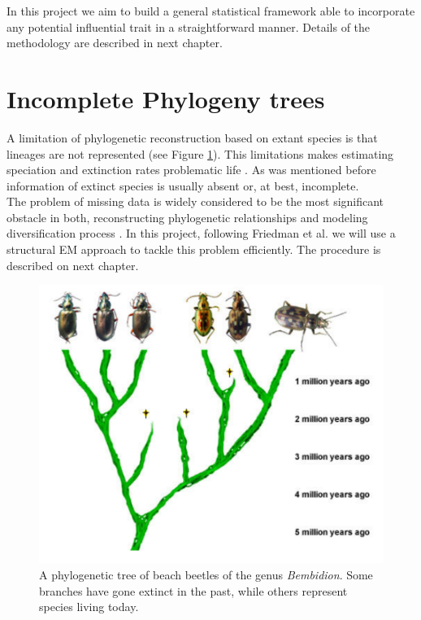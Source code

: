 In this project we aim to build a general statistical framework able to incorporate any potential influential trait in a straightforward manner. Details of the methodology are described in next chapter. \\
\section{Incomplete Phylogeny trees}


A limitation of phylogenetic reconstruction based on extant species is that lineages are not represented (see Figure \ref{incomp}). This limitations makes estimating speciation and extinction rates problematic life \cite{ricklefs2007estimating}. As was mentioned before information of extinct species is usually absent or, at best, incomplete.  \\

The problem of missing data is widely considered to be the most significant obstacle in both, reconstructing phylogenetic relationships and modeling diversification process \cite{wiens2003missing}.  In this project, following Friedman et al. \cite{friedman2002structural} we will use a structural EM approach to tackle this problem efficiently. The procedure is described on next chapter.  



\begin{figure}
\centering
\includegraphics[scale=0.45]{Pictures/tree.png}
\caption{A phylogenetic tree of beach beetles of the genus \emph{Bembidion}. Some branches have gone extinct in the past, while others represent species living today.}
\label{incomp}
\end{figure}

